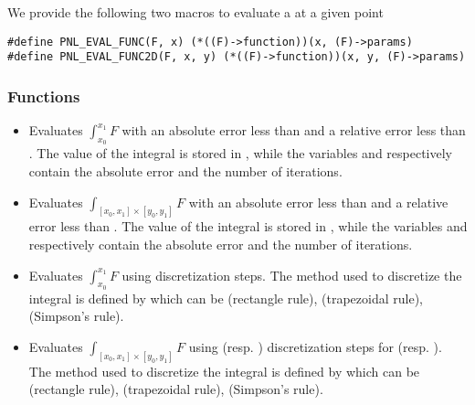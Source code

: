 We provide the following two macros to evaluate a  at
a given point
\begin{verbatim}
#define PNL_EVAL_FUNC(F, x) (*((F)->function))(x, (F)->params)
#define PNL_EVAL_FUNC2D(F, x, y) (*((F)->function))(x, y, (F)->params)
\end{verbatim}



\subsubsection{Functions}

\begin{itemize}
\item {}
  \sshortdescribe Evaluates $\int_{x_0}^{x_1} F$ with an absolute error less than
   and a relative error less than
  . The value of the integral is stored in , while the
  variables  and  respectively contain the absolute
  error and the number of iterations.

\item {}
  \sshortdescribe Evaluates $\int_{[x_0, x_1] \times [y_0, y_1]} F$ with an
  absolute error less than  and a relative error less than
  . The value of the integral is stored in , while the
  variables  and  respectively contain the absolute
  error and the number of iterations.

\item {}
  \sshortdescribe Evaluates $\int_{x_0}^{x_1} F$ using  discretization
  steps. The method used to discretize the integral is defined by 
  which can be  (rectangle rule),  (trapezoidal rule),
   (Simpson's rule).

\item {}
  \sshortdescribe Evaluates $\int_{[x_0, x_1] \times [y_0, y_1]} F$ using
   (resp. ) discretization steps for \var{[x0, x1]}
  (resp. \var{[y0, y1]}). The method used to discretize the integral is
  defined by  which can be  (rectangle rule),
   (trapezoidal rule),    (Simpson's rule).
\end{itemize}


